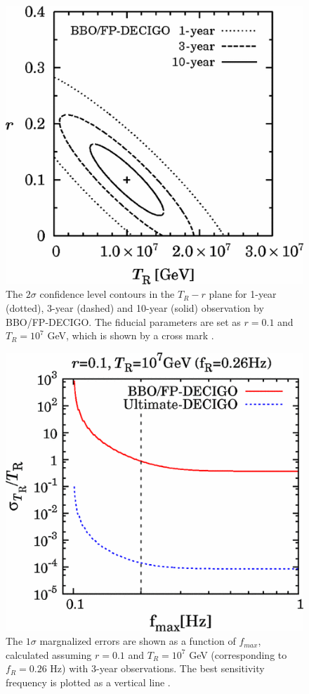 \documentclass[11pt,a4paper,twoside]{book}
\begin{document}
\begin{figure}
	\centering
	\includegraphics[width=0.7\linewidth, height=0.3\textheight]{Images/Chap3/Kurojanagi_Nakayama_Fig2}
	\caption{The $ 2\sigma $ confidence level contours in the $ T_{R}-r $ plane for 1-year (dotted), 3-year (dashed) and 10-year (solid) observation by BBO/FP-DECIGO. The fiducial parameters are set as $r=0.1$ and $ T_{R}=10^{7} $ GeV, which is shown by a cross mark \cite{Chap3:ProspectsForDeterminationWithDetectors}. }
	\label{fig:kurojanaginakayamafig2}
\end{figure}
\begin{figure}
	\centering
	\includegraphics[width=0.7\linewidth, height=0.3\textheight]{Images/Chap3/Kurojanagi_Nakayama_Fig3}
	\caption{The $ 1\sigma $ margnalized errors are shown as a function of $ f_{max} $, calculated assuming $ r=0.1 $ and $ T_{R}=10^{7} $ GeV (corresponding to $ f_{R}=0.26 $ Hz) with 3-year observations. The best sensitivity frequency is plotted as a vertical line \cite{Chap3:ProspectsForDeterminationWithDetectors}.}
	\label{fig:kurojanaginakayamafig3}
\end{figure}
\end{document}
